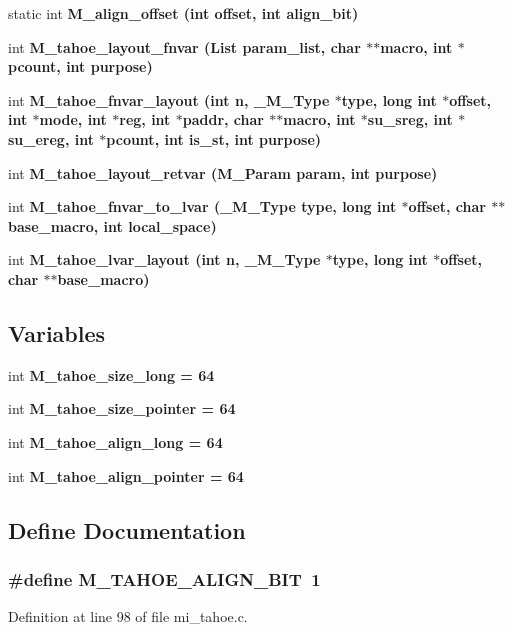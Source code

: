 \begin{CompactItemize}
static int \bf{M\_\-align\_\-offset} (int offset, int align\_\-bit)
\item 
int \bf{M\_\-tahoe\_\-layout\_\-fnvar} (\bf{List} param\_\-list, char $\ast$$\ast$macro, int $\ast$pcount, int purpose)
\item 
int \bf{M\_\-tahoe\_\-fnvar\_\-layout} (int n, \bf{\_\-M\_\-Type} $\ast$type, long int $\ast$offset, int $\ast$\bf{mode}, int $\ast$reg, int $\ast$paddr, char $\ast$$\ast$macro, int $\ast$su\_\-sreg, int $\ast$su\_\-ereg, int $\ast$pcount, int is\_\-st, int purpose)
\item 
int \bf{M\_\-tahoe\_\-layout\_\-retvar} (\bf{M\_\-Param} param, int purpose)
\item 
int \bf{M\_\-tahoe\_\-fnvar\_\-to\_\-lvar} (\bf{\_\-M\_\-Type} type, long int $\ast$offset, char $\ast$$\ast$base\_\-macro, int local\_\-space)
\item 
int \bf{M\_\-tahoe\_\-lvar\_\-layout} (int n, \bf{\_\-M\_\-Type} $\ast$type, long int $\ast$offset, char $\ast$$\ast$base\_\-macro)
\end{CompactItemize}
\subsection*{Variables}
\begin{CompactItemize}
\item 
int \bf{M\_\-tahoe\_\-size\_\-long} = 64
\item 
int \bf{M\_\-tahoe\_\-size\_\-pointer} = 64
\item 
int \bf{M\_\-tahoe\_\-align\_\-long} = 64
\item 
int \bf{M\_\-tahoe\_\-align\_\-pointer} = 64
\end{CompactItemize}


\subsection{Define Documentation}
\subsubsection{\setlength{\rightskip}{0pt plus 5cm}\#define M\_\-TAHOE\_\-ALIGN\_\-BIT~1}\label{mi__tahoe_8c_86b143aa16566c337da91e8230bdeeab}




Definition at line 98 of file mi\_\-tahoe.c.

